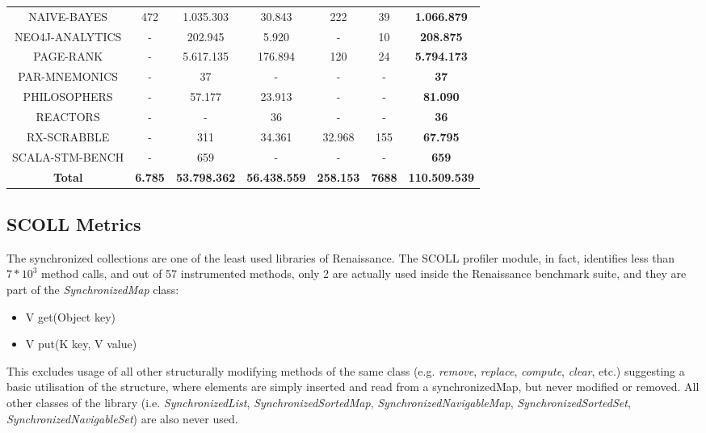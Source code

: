\documentclass[]{usiinfthesis}
\begin{document}
\begin{table}
{\begin{tabular}{|c|c|c|c|c|c||c|}
NAIVE-BAYES	&	 472 	&	 1.035.303 	&	 30.843 	&	 222 	&	 39 	&	\textbf{ 1.066.879} 	 \\ 
NEO4J-ANALYTICS	&	 -   	&	 202.945 	&	 5.920 	&	 -   	&	 10 	&	 \textbf{208.875} 	 \\ 
PAGE-RANK	&	 -   	&	 5.617.135 	&	 176.894 	&	 120 	&	 24 	&	\textbf{ 5.794.173 }	 \\ 
PAR-MNEMONICS	&	 -   	&	 37 	&	 -   	&	 -   	&	 -   	&	 \textbf{37} 	 \\ 
PHILOSOPHERS	&	 -   	&	 57.177 	&	 23.913 	&	 -   	&	 -   	&	 \textbf{81.090} 	 \\ 
REACTORS	&	 -   	&	 - 	&	 36 	&	 -   	&	 -   	&	 \textbf{36} 	 \\ 
RX-SCRABBLE	&	 -   	&	 311 	&	 34.361 	&	 32.968 	&	 155 	&	 \textbf{67.795} 	 \\ 
SCALA-STM-BENCH	&	 -   	&	 659 	&	 -   	&	 -   	&	 -   	&	 \textbf{659} 	 \\ 
\hline													
\hline													
\textbf{Total}	&  \textbf{	 6.785 	} &  \textbf{	 53.798.362 	} &  \textbf{	 56.438.559 	} &  \textbf{	 258.153 	} &  \textbf{	7688	} &  \textbf{	 110.509.539 	 }\\ 
\hline													
\end{tabular}
}
\end{table}%


\subsection{SCOLL Metrics}
The synchronized collections are one of the least used libraries of Renaissance. The SCOLL profiler module, in fact, identifies less than \(7*10^3\) method calls, and out of 57 instrumented methods, only 2 are actually used inside the Renaissance benchmark suite, and they are part of the \textit{SynchronizedMap} class:
\begin{itemize}
    \item V get(Object key)
    \item V put(K key, V value)
\end{itemize}
 This excludes usage of all other structurally modifying methods of the same class (e.g. \textit{remove}, \textit{replace}, \textit{compute}, \textit{clear}, etc.) suggesting a basic utilisation of the structure, where elements are simply inserted and read from a synchronizedMap, but never modified or removed. All other classes of the library (i.e. \textit{SynchronizedList}, \textit{SynchronizedSortedMap}, \textit{SynchronizedNavigableMap}, \textit{SynchronizedSortedSet}, \textit{SynchronizedNavigableSet}) are also never used.
 
\end{document}
